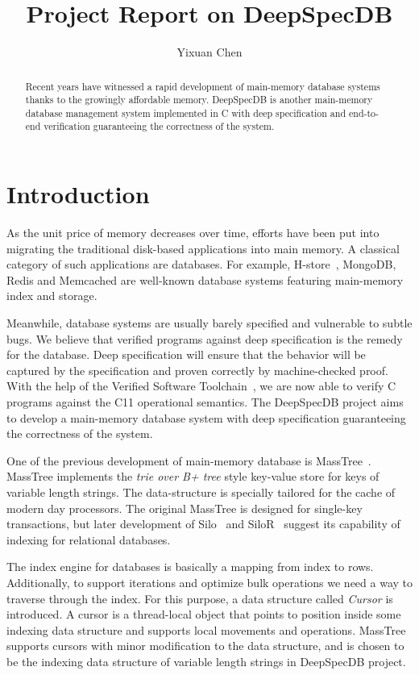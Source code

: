 \documentclass[runningheads]{llncs}
\begin{document}
%
\title{Project Report on DeepSpecDB}

\author{Yixuan Chen}
\maketitle

\begin{abstract}
  Recent years have witnessed a rapid development of main-memory database
  systems thanks to the growingly affordable memory. DeepSpecDB is another
  main-memory database management system implemented in C with deep
  specification and end-to-end verification guaranteeing the correctness of the
  system.
\end{abstract}

\section{Introduction}

As the unit price of memory decreases over time, efforts have been put into
migrating the traditional disk-based applications into main memory. A classical
category of such applications are databases. For example, H-store~\cite{hstore},
MongoDB, Redis and Memcached are well-known database systems featuring
main-memory index and storage.

Meanwhile, database systems are usually barely specified and vulnerable to
subtle bugs. We believe that verified programs against deep specification is the
remedy for the database. Deep specification will ensure that the behavior will
be captured by the specification and proven correctly by machine-checked proof.
With the help of the Verified Software Toolchain~\cite{VST}, we are now able to
verify C programs against the C11 operational semantics. The DeepSpecDB project
aims to develop a main-memory database system with deep specification
guaranteeing the correctness of the system. 

One of the previous development of main-memory database is
MassTree~\cite{masstree}. MassTree implements the \textit{trie over B+ tree} 
style key-value store for keys of variable length strings. The data-structure is
specially tailored for the cache of modern day processors. The original MassTree
is designed for single-key transactions, but later development of
Silo~\cite{Silo} and SiloR~\cite{SiloR} suggest its capability of indexing for
relational databases.

The index engine for databases is basically a mapping from index to rows.
Additionally, to support iterations and optimize bulk operations we need a way
to traverse through the index. For this purpose, a data structure called
\textit{Cursor} is introduced. A cursor is a thread-local object that points to
position inside some indexing data structure and supports local movements and
operations. MassTree supports cursors with minor modification to the data
structure, and is chosen to be the indexing data structure of variable length
strings in DeepSpecDB project.
\end{document}
